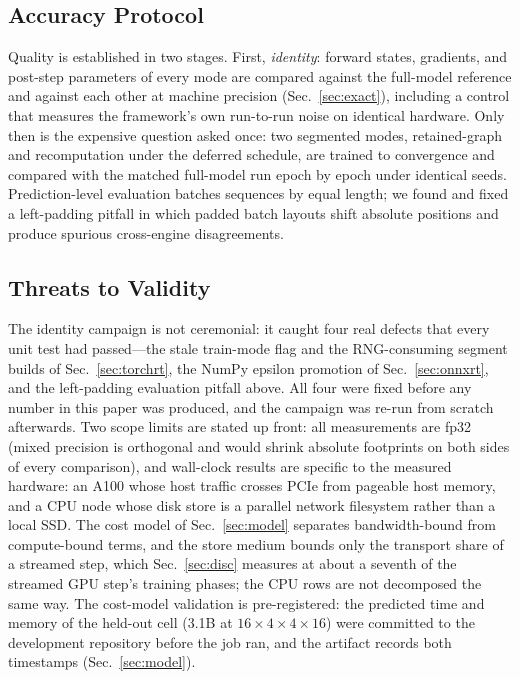 \documentclass[journal]{IEEEtran}
\begin{document}
\subsection{Accuracy Protocol}\label{sec:accproto}
Quality is established in two stages. First, \emph{identity}: forward states,
gradients, and post-step parameters of every mode are compared against the
full-model reference and against each other at machine precision
(Sec.~\ref{sec:exact}), including a control that measures the framework's own
run-to-run noise on identical hardware. Only then is the expensive question
asked once: two segmented modes,
retained-graph and recomputation under the deferred schedule, are trained
to convergence and compared with the matched full-model run epoch by epoch
under identical seeds.
Prediction-level evaluation batches sequences by equal length; we found and
fixed a left-padding pitfall in which padded batch layouts shift absolute
positions and produce spurious cross-engine disagreements.

\subsection{Threats to Validity}\label{sec:threats}
The identity campaign is not ceremonial: it caught four real defects that
every unit test had passed---the stale train-mode flag and the
RNG-consuming segment builds of Sec.~\ref{sec:torchrt}, the NumPy epsilon
promotion of Sec.~\ref{sec:onnxrt}, and the left-padding
evaluation pitfall above. All four were fixed before any number in this
paper was produced, and the campaign was re-run from scratch afterwards. Two
scope limits are stated up front: all measurements are fp32 (mixed precision
is orthogonal and would shrink absolute footprints on both sides of every
comparison), and wall-clock results are specific to the measured hardware: an A100 whose
host traffic crosses PCIe from pageable host memory, and a CPU node whose
disk store is a parallel network filesystem rather than a local SSD. The
cost model of Sec.~\ref{sec:model} separates bandwidth-bound from
compute-bound terms, and the store medium bounds only the transport share
of a streamed step, which Sec.~\ref{sec:disc} measures at about a seventh of
the streamed GPU step's training phases; the CPU rows are not decomposed the same way. The cost-model validation is pre-registered: the predicted time and memory
of the held-out cell (3.1B at $16{\times}4{\times}4{\times}16$) were
committed to the development repository before the job ran, and the
artifact records both timestamps (Sec.~\ref{sec:model}).
\end{document}
